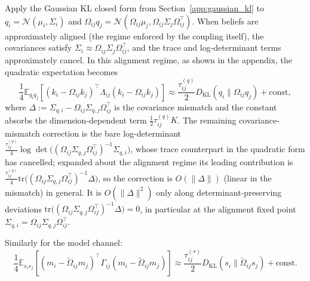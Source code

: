 \documentclass[11pt]{article}
\begin{document}
Apply the Gaussian KL closed form from Section~\ref{app:gaussian_kl} to $q_i = \mathcal{N}(\mu_i,\Sigma_i)$ and $\Omega_{ij}q_j = \mathcal{N}(\Omega_{ij}\mu_j, \Omega_{ij}\Sigma_j\Omega_{ij}^\top)$. When beliefs are approximately aligned (the regime enforced by the coupling itself), the covariances satisfy $\Sigma_i \approx \Omega_{ij}\Sigma_j\Omega_{ij}^\top$, and the trace and log-determinant terms approximately cancel. In this alignment regime, as shown in the appendix, the quadratic expectation becomes
\begin{equation}
\frac{1}{4}\mathbb{E}_{q_i q_j}
[(k_i-\Omega_{ij}k_j)^\top\Lambda_{ij}(k_i-\Omega_{ij}k_j)]
\approx
\frac{\tau^{(q)}_{ij}}{2}D_{\mathrm{KL}}(q_i\|\Omega_{ij}q_j)+\text{const},
\end{equation}
where $\Delta := \Sigma_{q,i} - \Omega_{ij}\Sigma_{q,j}\Omega_{ij}^\top$ is the covariance mismatch and the constant absorbs the dimension-dependent term $\tfrac{1}{2}\tau^{(q)}_{ij}K$. The remaining covariance-mismatch correction is the bare log-determinant $\tfrac{\tau^{(q)}_{ij}}{4}\log\det\big((\Omega_{ij}\Sigma_{q,j}\Omega_{ij}^\top)^{-1}\Sigma_{q,i}\big)$, whose trace counterpart in the quadratic form has cancelled; expanded about the alignment regime its leading contribution is $\tfrac{\tau^{(q)}_{ij}}{4}\mathrm{tr}\big((\Omega_{ij}\Sigma_{q,j}\Omega_{ij}^\top)^{-1}\Delta\big)$, so the correction is $O(\|\Delta\|)$ (linear in the mismatch) in general. It is $O(\|\Delta\|^2)$ only along determinant-preserving deviations $\mathrm{tr}\big((\Omega_{ij}\Sigma_{q,j}\Omega_{ij}^\top)^{-1}\Delta\big)=0$, in particular at the alignment fixed point $\Sigma_{q,i}=\Omega_{ij}\Sigma_{q,j}\Omega_{ij}^\top$.

Similarly for the model channel:
\begin{equation}
\frac{1}{4}\mathbb{E}_{s_i s_j}
[(m_i-\tilde{\Omega}_{ij}m_j)^\top\Gamma_{ij}(m_i-\tilde{\Omega}_{ij}m_j)]
\approx
\frac{\tau^{(s)}_{ij}}{2}D_{\mathrm{KL}}(s_i\|\tilde{\Omega}_{ij}s_j)+\text{const}.
\end{equation}
\end{document}
